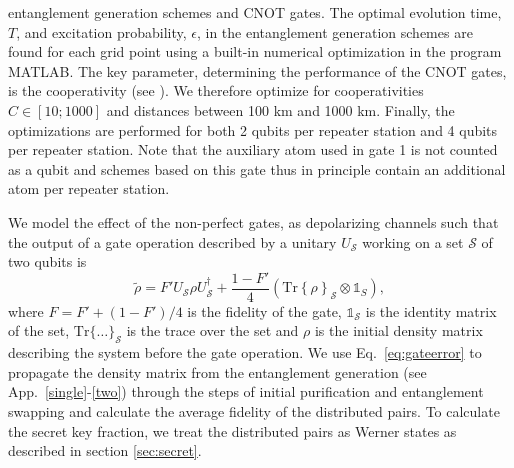 entanglement generation schemes and CNOT gates. The optimal evolution time, $T$,
and excitation probability, $\epsilon$, in the entanglement generation schemes
are found for each grid point using a built-in numerical optimization in the
program MATLAB.
The key parameter, determining the performance of the CNOT gates, is the
cooperativity (see ). We therefore optimize for
cooperativities $C\in[10;1000]$ and distances between 100 km and 1000 km.
Finally, the optimizations are performed for both 2 qubits per repeater station
and 4 qubits per repeater station. Note that the auxiliary atom used in gate 1
is not counted as a qubit and schemes based on this gate thus in principle
contain an additional atom per repeater station.

We model the effect of the non-perfect gates, as depolarizing channels such that
the output of a gate operation described by a unitary $U_{\mathcal{S}}$ working
on a set $\mathcal{S}$ of two qubits is
\begin{equation} \label{eq:gateerror}
\tilde{\rho}=F'U_{\mathcal{S}}\rho
U^{\dagger}_{\mathcal{S}}+\frac{1-F'}{4}\left(\mathrm{Tr}
\left\{\rho\right\}_{\mathcal{S}}\otimes\mathds{1}_{S}\right),
\end{equation}
where $F=F'+(1-F')/4$ is the fidelity of the gate, $\mathds{1}_{\mathcal{S}}$ is
the identity matrix of the set, $\mathrm{Tr}\{\ldots\}_{\mathcal{S}}$ is the
trace over the set and $\rho$ is the initial density matrix describing the system
before the gate operation. We use Eq.~\eqref{eq:gateerror} to propagate the
density matrix from the entanglement generation (see
App.~\ref{single}-\ref{two}) through the steps of initial purification and
entanglement swapping and calculate the average fidelity of the distributed
pairs. To calculate the secret key fraction, we treat the distributed pairs as
Werner states as described in section \ref{sec:secret}.
